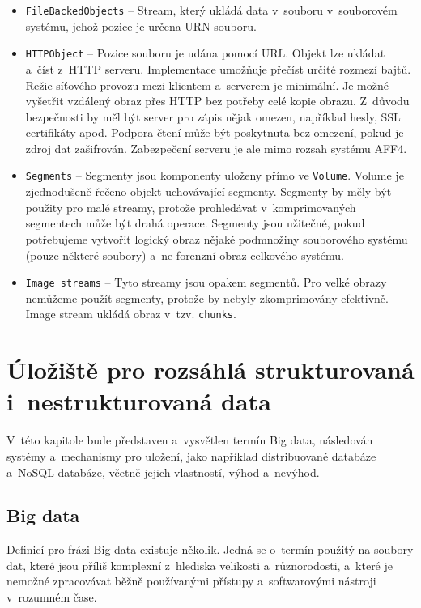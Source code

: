 \begin{itemize}
\item \texttt{FileBackedObjects} -- Stream, který ukládá data v~souboru v~souborovém systému, jehož pozice je určena URN souboru.

\item \texttt{HTTPObject} -- Pozice souboru je udána pomocí URL. Objekt lze ukládat a~číst z~HTTP serveru. Implementace umožňuje přečíst určité rozmezí bajtů. Režie síťového provozu mezi klientem a~serverem je minimální. Je možné vyšetřit vzdálený obraz přes HTTP bez potřeby celé kopie obrazu. Z~důvodu bezpečnosti by měl být server pro zápis nějak omezen, například hesly, SSL certifikáty apod. Podpora čtení může být poskytnuta bez omezení, pokud je zdroj dat zašifrován. Zabezpečení serveru je ale mimo rozsah systému AFF4.

\item \texttt{Segments} -- Segmenty jsou komponenty uloženy přímo ve \texttt{Volume}. Volume je zjednodušeně řečeno objekt uchovávající segmenty. Segmenty by měly být použity pro malé streamy, protože prohledávat v~komprimovaných segmentech může být drahá operace. Segmenty jsou užitečné, pokud potřebujeme vytvořit logický obraz nějaké podmnožiny souborového systému (pouze některé soubory) a~ne forenzní obraz celkového systému.

\item \texttt{Image streams} -- Tyto streamy jsou opakem segmentů. Pro velké obrazy nemůžeme použít segmenty, protože by nebyly zkomprimovány efektivně. Image stream ukládá obraz v~tzv. \texttt{chunks}.
\end{itemize}

\chapter{Úložiště pro rozsáhlá strukturovaná i~nestrukturovaná data} \label{chapter2}
V~této kapitole bude představen a~vysvětlen termín Big data, následován systémy a~mechanismy pro uložení, jako například distribuované databáze a~NoSQL databáze, včetně jejich vlastností, výhod a~nevýhod.

\section{Big data} \label{bigDataSection}
Definicí pro frázi Big data existuje několik. Jedná se o~termín použitý na soubory dat, které jsou příliš komplexní z~hlediska velikosti a~různorodosti, a~které je nemožné zpracovávat běžně používanými přístupy a~softwarovými nástroji v~rozumném čase.

